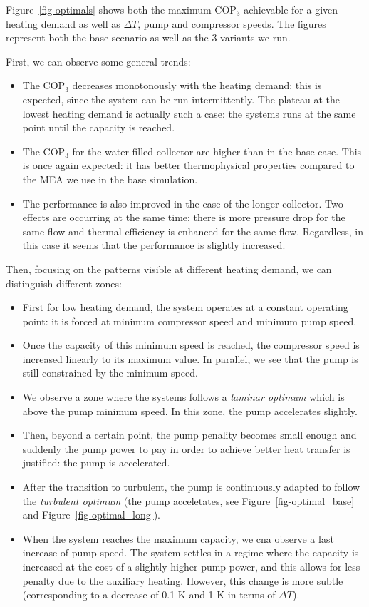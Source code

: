 \documentclass[journal=iecr,manuscript=]{achemso}
\begin{document}
Figure~\ref{fig-optimals} shows both the maximum \(\text{COP}_3\)
achievable for a given heating demand as well as \(\Delta T\), pump and
compressor speeds. The figures represent both the base scenario as well
as the 3 variants we run.

First, we can observe some general trends:

\begin{itemize}
\item
  The \(\text{COP}_3\) decreases monotonously with the heating demand:
  this is expected, since the system can be run intermittently. The
  plateau at the lowest heating demand is actually such a case: the
  systems runs at the same point until the capacity is reached.
\item
  The \(\text{COP}_3\) for the water filled collector are higher than in
  the base case. This is once again expected: it has better
  thermophysical properties compared to the MEA we use in the base
  simulation.
\item
  The performance is also improved in the case of the longer collector.
  Two effects are occurring at the same time: there is more pressure
  drop for the same flow and thermal efficiency is enhanced for the same
  flow. Regardless, in this case it seems that the performance is
  slightly increased.
\end{itemize}

Then, focusing on the patterns visible at different heating demand, we
can distinguish different zones:

\begin{itemize}
\item
  First for low heating demand, the system operates at a constant
  operating point: it is forced at minimum compressor speed and minimum
  pump speed.
\item
  Once the capacity of this minimum speed is reached, the compressor
  speed is increased linearly to its maximum value. In parallel, we see
  that the pump is still constrained by the minimum speed.
\item
  We observe a zone where the systems follows a \emph{laminar optimum}
  which is above the pump minimum speed. In this zone, the pump
  accelerates slightly.
\item
  Then, beyond a certain point, the pump penality becomes small enough
  and suddenly the pump power to pay in order to achieve better heat
  transfer is justified: the pump is accelerated.
\item
  After the transition to turbulent, the pump is continuously adapted to
  follow the \emph{turbulent optimum} (the pump acceletates, see
  Figure~\ref{fig-optimal_base} and Figure~\ref{fig-optimal_long}).
\item
  When the system reaches the maximum capacity, we cna observe a last
  increase of pump speed. The system settles in a regime where the
  capacity is increased at the cost of a slightly higher pump power, and
  this allows for less penalty due to the auxiliary heating. However,
  this change is more subtle (corresponding to a decrease of 0.1 K and 1
  K in terms of \(\Delta T\)).
\end{itemize}
\end{document}
